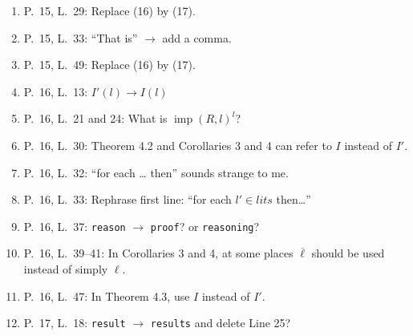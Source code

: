 \documentclass[11pt]{article}
\theoremstyle{definition}
\begin{document}
\begin{enumerate}
    \item P.~15, L.~29: Replace (16) by (17). 
    \item P.~15, L.~33: ``That is'' $\rightarrow$ add a comma.
    \item P.~15, L.~49: Replace (16) by (17).
    \item P.~16, L.~13: $I'(l) \rightarrow I(l)$
    \item P.~16, L.~21 and 24: What is $\operatorname{imp}(R,l)^l$?
    \item P.~16, L.~30: Theorem 4.2 and Corollaries 3 and 4 can refer to $I$ instead of $I'$.
    \item P.~16, L.~32: ``for each \ldots{} then'' sounds strange to me.
    \item P.~16, L.~33: Rephrase first line: ``for each $l'\in lits$ then\ldots''
    \item P.~16, L.~37: \texttt{reason} $\rightarrow$ \texttt{proof}? or \texttt{reasoning}?
    \item P.~16, L.~39--41: In Corollaries 3 and 4, at some places $\overline{\ell}$ should be used instead of simply $\ell$.
    \item P.~16, L.~47: In Theorem 4.3, use $I$ instead of $I'$.
    \item P.~17, L.~18: \texttt{result} $\rightarrow$ \texttt{results} and delete Line 25?


\end{enumerate}
\end{document}
